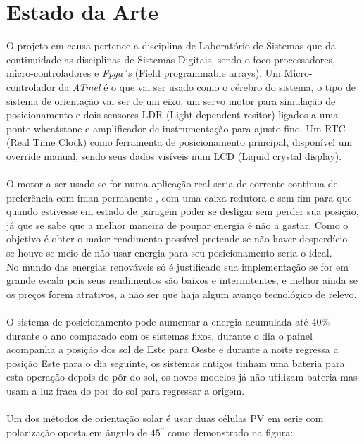 \section{Estado da Arte}
\qquad O projeto em causa pertence a disciplina de Laboratório de Sistemas que da continuidade as disciplinas de Sistemas Digitais, sendo o foco processadores, micro-controladores e {\it Fpga´s} (Field programmable arrays). Um Micro-controlador da {\it ATmel} é o que vai ser usado como o cérebro do sistema, o tipo de sistema de orientação vai ser de um eixo, um servo motor para simulação de posicionamento e dois sensores LDR (Light dependent resitor) ligados a uma ponte wheatstone e amplificador de instrumentação para ajusto fino. Um RTC (Real Time Clock) como ferramenta de posicionamento principal, disponível um override manual, sendo seus dados visíveis num LCD (Liquid crystal display). \\
\\
O motor a ser usado se for numa aplicação real seria de corrente continua de preferência com íman permanente \cite{book_1} , com uma caixa redutora e sem fim para que quando estivesse em estado de paragem poder se desligar sem perder sua posição, já que se sabe que a melhor maneira de poupar energia é não a gastar. Como o objetivo é obter o maior rendimento possível pretende-se não haver desperdício, se houve-se meio de não usar energia para seu posicionamento seria o ideal.\\
No mundo das energias renováveis só é justificado sua implementação se for em grande escala pois seus rendimentos são baixos e intermitentes, e melhor ainda se os preços forem atrativos, a não ser que haja algum avanço tecnológico de relevo.\\
\\
O sistema de posicionamento pode aumentar a energia acumulada até 40\% durante o ano comparado com os sistemas fixos, durante o dia o painel acompanha a posição dos sol de Este para Oeste e durante a noite regressa a posição Este para o dia seguinte, os sistemas antigos tinham uma bateria para esta operação depois do pôr do sol, os novos modelos já não utilizam bateria mas usam a luz fraca do por do sol para regressar a origem. \cite{book_2} \\
\\
Um dos métodos de orientação solar é usar duas células PV em serie com polarização oposta em ângulo de $45^o$ como demonstrado na figura:

